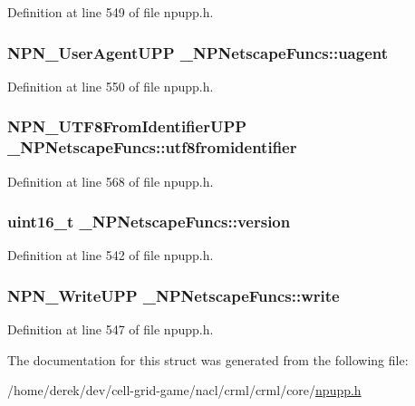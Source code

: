 Definition at line 549 of file npupp.h.

\hypertarget{struct___n_p_netscape_funcs_a03b50f7c28ca7a833972e367ec9c5593}{
\subsubsection[{uagent}]{\setlength{\rightskip}{0pt plus 5cm}NPN\_\-UserAgentUPP {\bf \_\-NPNetscapeFuncs::uagent}}}
\label{struct___n_p_netscape_funcs_a03b50f7c28ca7a833972e367ec9c5593}


Definition at line 550 of file npupp.h.

\hypertarget{struct___n_p_netscape_funcs_ad25232852fd00d9d06492a14550b4c4c}{
\subsubsection[{utf8fromidentifier}]{\setlength{\rightskip}{0pt plus 5cm}NPN\_\-UTF8FromIdentifierUPP {\bf \_\-NPNetscapeFuncs::utf8fromidentifier}}}
\label{struct___n_p_netscape_funcs_ad25232852fd00d9d06492a14550b4c4c}


Definition at line 568 of file npupp.h.

\hypertarget{struct___n_p_netscape_funcs_a86d9a0fc8a59532aca76b188920b253f}{
\subsubsection[{version}]{\setlength{\rightskip}{0pt plus 5cm}uint16\_\-t {\bf \_\-NPNetscapeFuncs::version}}}
\label{struct___n_p_netscape_funcs_a86d9a0fc8a59532aca76b188920b253f}


Definition at line 542 of file npupp.h.

\hypertarget{struct___n_p_netscape_funcs_acba5d605d7ce8877eac02c6791194c93}{
\subsubsection[{write}]{\setlength{\rightskip}{0pt plus 5cm}NPN\_\-WriteUPP {\bf \_\-NPNetscapeFuncs::write}}}
\label{struct___n_p_netscape_funcs_acba5d605d7ce8877eac02c6791194c93}


Definition at line 547 of file npupp.h.



The documentation for this struct was generated from the following file:\begin{DoxyCompactItemize}
\item 
/home/derek/dev/cell-\/grid-\/game/nacl/crml/crml/core/\hyperlink{npupp_8h}{npupp.h}\end{DoxyCompactItemize}
